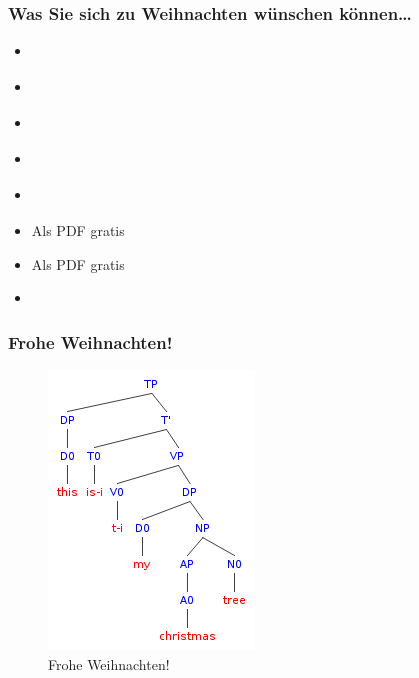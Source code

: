 \begin{frame}
\frametitle{Was Sie sich zu Weihnachten wünschen können\dots}

\begin{itemize}
	\item \citet{Glueck05a}
	\item \citet{Luedeling2009a}
	\item \citet{Brandt&Co06a}
	\item \citet{Grewendorf&Co91a}
	\item \citet{Chomsky65a}
	\item \citet{MuellerS15b} \ras Als PDF gratis
	\item \citet{MuellerS13f} \ras Als PDF gratis
	\item \citet{Pinker95a}

\end{itemize}

\end{frame}


\begin{frame}
\frametitle{Frohe Weihnachten!}

\begin{figure}
\centering
	\includegraphics[scale=.6]{material/09xmastree}
	\caption{Frohe Weihnachten!}
\end{figure}

\end{frame}


